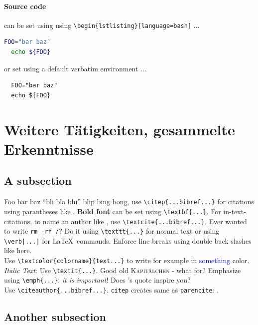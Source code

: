 \paragraph{Source code} can be set using using \verb|\begin{lstlisting}[language=bash]| ...
  \begin{lstlisting}[language=bash]
  FOO="bar baz"
  echo ${FOO}
  \end{lstlisting}

  or set using a default verbatim environment ...
  \begin{verbatim}
  FOO="bar baz"
  echo ${FOO}
  \end{verbatim}

\section{Weitere Tätigkeiten, gesammelte Erkenntnisse}
	\lipsum[12] %

	\subsection{A subsection}
	  Foo bar baz ``bli bla blu'' blip bing bong, use \verb|\citep{...bibref...}| for citations
	  using parantheses like \citep{DBLP:books/aw/Knuth73}.
	  \textbf{Bold font} can be set using \verb|\textbf{...}|.
	  For in-text-citations, to name an author like \textcite{DBLP:books/aw/Knuth73},
	  use \verb|\textcite{...bibref...}|. Ever wanted to
	  write \texttt{rm -rf /}? Do it using \verb|\texttt{...}| for normal text
	  or using \verb!\verb|...|! for \LaTeX\ commands. Enforce line breaks
	  using double back slashes like here.
	  \\
	  Use \verb|\textcolor{colorname}{text...}|
	  to write for example in \textcolor{blue}{something} color.
	  \\
	  \textit{Italic Text}: Use \verb|\textit{...}|.
	  Good old \textsc{Kapitälchen} - what for? Emphasize using \verb|\emph{...}|: \emph{it is important}!
	  Does \citeauthor{DBLP:books/aw/Knuth73}'s quote inspire you?
	  \\
	  Use \verb|\citeauthor{...bibref...}|.
	  \texttt{citep} creates same as \texttt{parencite}: \citep{DBLP:books/aw/Knuth73}.
	  \lipsum[13] %

  	\subsection{Another subsection}
    	\lipsum[1] %

